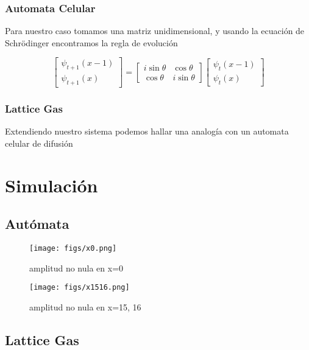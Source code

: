 \documentclass[12pts, letterpaper, twocolumn]{article}
\begin{document}
\subsubsection{Automata Celular}
 Para nuestro caso tomamos una matriz unidimensional, y usando la ecuación de Schrödinger 
 encontramos la regla de evolución \cite{meyer}

 \begin{equation}\label{eq:evolution}
    \left[ 
    \begin{matrix}
        \psi_{t+1}(x-1) \\
        \psi_{t+1}(x)
    \end{matrix}
    \right] = 
    \begin{bmatrix}
        i\sin\theta & \cos\theta \\
        \cos\theta & i\sin\theta
    \end{bmatrix}
    \left[ 
    \begin{matrix}
        \psi_{t}(x-1) \\
        \psi_{t}(x)
    \end{matrix}
    \right]
\end{equation}
\subsubsection{Lattice Gas}
Extendiendo nuestro sistema podemos hallar una analogía con un automata celular de difusión



\section{Simulación}
\subsection{Autómata}

\begin{figure*}[h]
    \centering
    \texttt{[image: figs/x0.png]}
    \caption{amplitud no nula en x=0}
    \label{fig:x0}
\end{figure*}

\begin{figure*}[h]
    \centering
    \texttt{[image: figs/x1516.png]}
    \caption{amplitud no nula en x=15, 16}
    \label{fig:x15}
\end{figure*}


\subsection{Lattice Gas}
\end{document}
